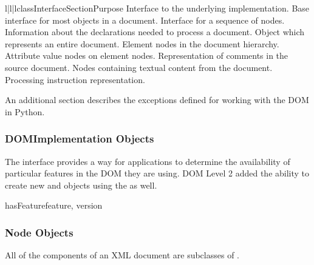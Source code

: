 \begin{tableiii}{l|l|l}{class}{Interface}{Section}{Purpose}
          {Interface to the underlying implementation.}
          {Base interface for most objects in a document.}
          {Interface for a sequence of nodes.}
          {Information about the declarations needed to process a document.}
          {Object which represents an entire document.}
          {Element nodes in the document hierarchy.}
          {Attribute value nodes on element nodes.}
          {Representation of comments in the source document.}
          {Nodes containing textual content from the document.}
          {Processing instruction representation.}
\end{tableiii}

An additional section describes the exceptions defined for working
with the DOM in Python.


\subsubsection{DOMImplementation Objects
               \label{dom-implementation-objects}}

The  interface provides a way for
applications to determine the availability of particular features in
the DOM they are using.  DOM Level 2 added the ability to create new
 and  objects using the
 as well.

\begin{methoddesc}[DOMImplementation]{hasFeature}{feature, version}
\end{methoddesc}


\subsubsection{Node Objects \label{dom-node-objects}}

All of the components of an XML document are subclasses of
.

